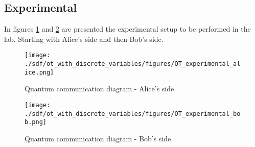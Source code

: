 \subsection{Experimental}
In figures \ref{quantumchannelcommunication1} and \ref{quantumchannelcommunication2} are presented the experimental setup to be performed in the lab. Starting with Alice's side and then Bob's side.

\begin{figure}[H]
	\centering \texttt{[image: ./sdf/ot\_with\_discrete\_variables/figures/OT\_experimental\_alice.png]}
	\caption{Quantum communication diagram - Alice's side}\label{quantumchannelcommunication1}
\end{figure}

\begin{figure}[H]
	\centering \texttt{[image: ./sdf/ot\_with\_discrete\_variables/figures/OT\_experimental\_bob.png]}
	\caption{Quantum communication diagram - Bob's side}\label{quantumchannelcommunication2}
\end{figure} 
